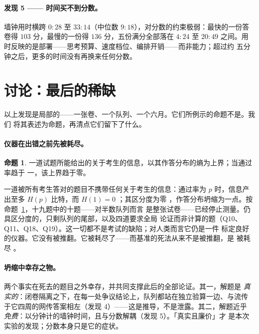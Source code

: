 \documentclass[11pt,UTF8]{ctexart}
\theoremstyle{definition}
\newtheorem{proposition}{命题}
\newcommand{\Q}[1]{Q#1}
\begin{document}
\paragraph{发现 5 —— 时间买不到分数。}
墙钟用时横跨 $0{:}28$ 至 $33{:}14$（中位数
$9{:}18$），对分数的约束极弱：最快的一份答卷得 $103$ 分，最慢的一份得
$136$ 分，五份满分全部落在 $4{:}24$ 至 $20{:}49$
之间。用时反映的是部署——思考预算、速度档位、编排开销——而非能力；超过约
五分钟之后，更多的时间没有再换来任何分数。

\section{讨论：最后的稀缺}
\label{sec:discussion}

以上发现是局部的——一张卷、一个队列、一个六月。它们所例示的命题不是。我们
将其表述为命题，再清点它们留下了什么。

\paragraph{仪器在出错之前先被耗尽。}
\begin{proposition}\label{prop:exhaustion}
一道试题所能给出的关于考生的信息，以其作答分布的熵为上界；当通过率趋于
一，该上界趋于零。
\end{proposition}
一道被所有考生答对的题目不携带任何关于考生的信息：通过率为 $p$
时，信息产出至多 $H(p)$ 比特，而 $H(1)=0$
\citep{shannon1948mathematical}；其区分度为零
\citep{lord1980applications}，作答分布坍缩为一点。按命题~\ref{prop:exhaustion}，十九题中的十题——对半数队列而言
是整张试卷——已经停止测量。仍具区分度的，只剩队列的尾部，以及四道要求全局
论证而非计算的题（\Q{10}、\Q{11}、\Q{18}、\Q{19}）。这一切都不是考试的缺陷；对人类而言它仍是一件
标定良好的仪器。它没有被推翻。它被耗尽了——而基准的死法从来不是被推翻，是
被耗尽 \citep{ott2022mapping,kiela2021dynabench}。

\paragraph{坍缩中幸存之物。}
两个事实在死去的题目之外幸存，并共同支撑此后的全部论证。其一，解题是\emph{
真实的}：闭卷隔离之下，在每一处争议结论上，队列都站在独立验算一边、与流传
于它四周的网传答案相左（发现 4）——这是推导，不是泄露。其二，解题近乎
\emph{免费}：以分钟计的墙钟时间，且与分数解耦（发现 5）。「真实且廉价」才
是本次实验的发现；分数本身只是它的症状。
\end{document}
